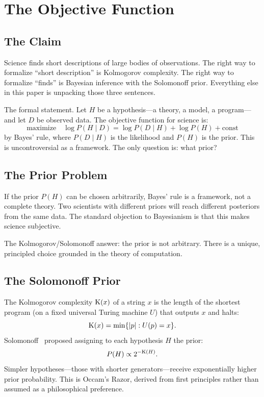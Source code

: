 \section{The Objective Function}

\subsection{The Claim}

Science finds short descriptions of large bodies of observations. The right
way to formalize ``short description'' is Kolmogorov complexity. The right
way to formalize ``finds'' is Bayesian inference with the Solomonoff prior.
Everything else in this paper is unpacking those three sentences.

The formal statement. Let $H$ be a hypothesis---a theory, a model, a
program---and let $D$ be observed data. The objective function for science is:
\begin{equation}
  \text{maximize} \quad \log P(H \mid D)
  = \log P(D \mid H) + \log P(H) + \text{const}
  \label{eq:bayes}
\end{equation}
by Bayes' rule, where $P(D \mid H)$ is the likelihood and $P(H)$ is the
prior. This is uncontroversial as a framework. The only question is: what
prior?

\subsection{The Prior Problem}

If the prior $P(H)$ can be chosen arbitrarily, Bayes' rule is a framework,
not a complete theory. Two scientists with different priors will reach
different posteriors from the same data. The standard objection to
Bayesianism is that this makes science subjective.

The Kolmogorov/Solomonoff answer: the prior is not arbitrary. There is a
unique, principled choice grounded in the theory of computation.

\subsection{The Solomonoff Prior}

The Kolmogorov complexity $\mathrm{K}(x)$ of a string $x$ is the length of the
shortest program (on a fixed universal Turing machine $U$) that outputs $x$
and halts:
\[
  \mathrm{K}(x) = \min\{ |p| : U(p) = x \}.
\]
Solomonoff~\cite{solomonoff1964} proposed assigning to each hypothesis $H$
the prior:
\[
  P(H) \propto 2^{-\mathrm{K}(H)}.
\]
Simpler hypotheses---those with shorter generators---receive exponentially
higher prior probability. This is Occam's Razor, derived from first
principles rather than assumed as a philosophical preference.

